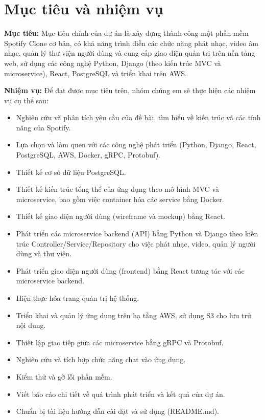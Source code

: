 \section{Mục tiêu và nhiệm vụ}
\label{sec:intro_aims_obj}
\textbf{Mục tiêu:} Mục tiêu chính của dự án là xây dựng thành công một phần mềm Spotify Clone cơ bản, có khả năng trình diễn các chức năng phát nhạc, video âm nhạc, quản lý thư viện người dùng và cung cấp giao diện quản trị trên nền tảng web, sử dụng các công nghệ Python, Django (theo kiến trúc MVC và microservice), React, PostgreSQL và triển khai trên AWS.

\textbf{Nhiệm vụ:} Để đạt được mục tiêu trên, nhóm chúng em sẽ thực hiện các nhiệm vụ cụ thể sau:
\begin{itemize}
    \item Nghiên cứu và phân tích yêu cầu của đề bài, tìm hiểu về kiến trúc và các tính năng của Spotify.
    \item Lựa chọn và làm quen với các công nghệ phát triển (Python, Django, React, PostgreSQL, AWS, Docker, gRPC, Protobuf).
    \item Thiết kế cơ sở dữ liệu PostgreSQL.
    \item Thiết kế kiến trúc tổng thể của ứng dụng theo mô hình MVC và microservice, bao gồm việc container hóa các service bằng Docker.
    \item Thiết kế giao diện người dùng (wireframe và mockup) bằng React.
    \item Phát triển các microservice backend (API) bằng Python và Django theo kiến trúc Controller/Service/Repository cho việc phát nhạc, video, quản lý người dùng và thư viện.
    \item Phát triển giao diện người dùng (frontend) bằng React tương tác với các microservice backend.
    \item Hiện thực hóa trang quản trị hệ thống.
    \item Triển khai và quản lý ứng dụng trên hạ tầng AWS, sử dụng S3 cho lưu trữ nội dung.
    \item Thiết lập giao tiếp giữa các microservice bằng gRPC và Protobuf.
    \item Nghiên cứu và tích hợp chức năng chat vào ứng dụng.
    \item Kiểm thử và gỡ lỗi phần mềm.
    \item Viết báo cáo chi tiết về quá trình phát triển và kết quả của dự án.
    \item Chuẩn bị tài liệu hướng dẫn cài đặt và sử dụng (README.md).
\end{itemize}

